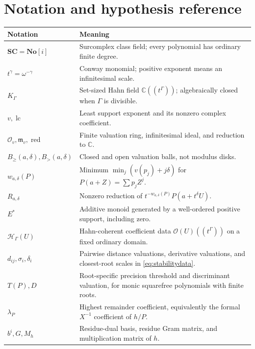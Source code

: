 \documentclass[11pt,letterpaper]{article}
\numberwithin{equation}{section}
\theoremstyle{definition}
\theoremstyle{remark}
\newcommand{\No}{\mathbf{No}}
\newcommand{\SC}{\mathbf{SC}}
\newcommand{\C}{\mathbb C}
\newcommand{\OO}{\mathcal O}
\newcommand{\HH}{\mathcal H_\Gamma}
\newcommand{\Ov}{\mathcal O_v}
\newcommand{\mv}{\mathfrak m_v}
\newcommand{\red}{\operatorname{red}}
\newcommand{\lc}{\operatorname{lc}}
\newcommand{\Bge}[2]{B_{\ge}(#1,#2)}
\newcommand{\Bgt}[2]{B_{>}(#1,#2)}
\begin{document}
\section{Notation and hypothesis reference}\label{app:notation}
\begin{longtable}{@{}P{0.28\textwidth}P{0.67\textwidth}@{}}
\toprule
Notation & Meaning\\
\midrule
\endhead
$\SC=\No[i]$ & Surcomplex class field; every polynomial has ordinary finite degree.\\[0.3em]
$t^\gamma=\omega^{-\gamma}$ & Conway monomial; positive exponent means an infinitesimal scale.\\[0.3em]
$K_\Gamma$ & Set-sized Hahn field $\C((t^\Gamma))$; algebraically closed when $\Gamma$ is divisible.\\[0.3em]
$v,\lc$ & Least support exponent and its nonzero complex coefficient.\\[0.3em]
$\Ov,\mv,\red$ & Finite valuation ring, infinitesimal ideal, and reduction to $\C$.\\[0.3em]
$\Bge{a}{\delta},\Bgt{a}{\delta}$ & Closed and open valuation balls, not modulus disks.\\[0.3em]
$w_{a,\delta}(P)$ & Minimum $\min_j(v(p_j)+j\delta)$ for $P(a+Z)=\sum p_jZ^j$.\\[0.3em]
$R_{a,\delta}$ & Nonzero reduction of $t^{-w_{a,\delta}(P)}P(a+t^\delta U)$.\\[0.3em]
$E^*$ & Additive monoid generated by a well-ordered positive support, including zero.\\[0.3em]
$\HH(U)$ & Hahn-coherent coefficient data $\OO(U)((t^\Gamma))$ on a fixed ordinary domain.\\[0.3em]
$d_{ij},\sigma_i,\delta_i$ & Pairwise distance valuations, derivative valuations, and closest-root scales in \eqref{eq:stabilitydata}.\\[0.3em]
$T(P),D$ & Root-specific precision threshold and discriminant valuation, for monic squarefree polynomials with finite roots.\\[0.3em]
$\lambda_P$ & Highest remainder coefficient, equivalently the formal $X^{-1}$ coefficient of $h/P$.\\[0.3em]
$b^i,G,M_h$ & Residue-dual basis, residue Gram matrix, and multiplication matrix of $h$.\\
\bottomrule
\end{longtable}
\end{document}
